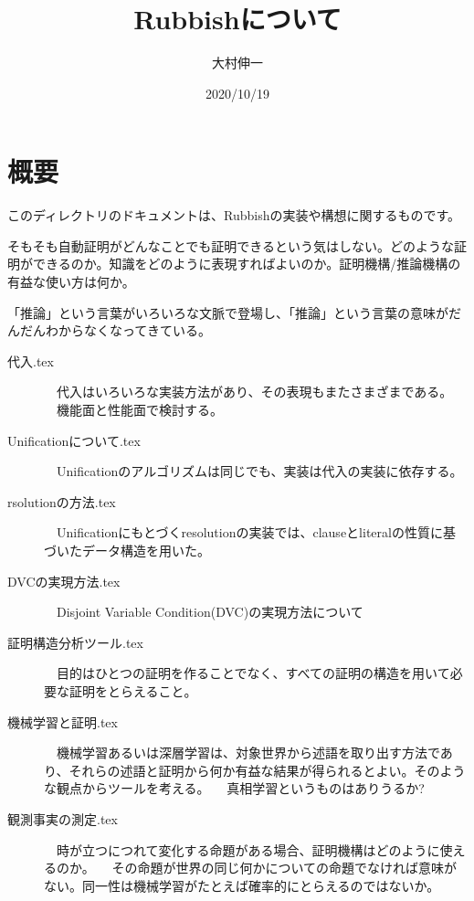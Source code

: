 \documentclass[10pt, oneside]{jarticle}   	%
\title{Rubbishについて}
\author{大村伸一}
\date{2020/10/19}				%
\theoremstyle{definition}
\begin{document}
\maketitle

\section{概要}
このディレクトリのドキュメントは、Rubbishの実装や構想に関するものです。

そもそも自動証明がどんなことでも証明できるという気はしない。どのような証明ができるのか。知識をどのように表現すればよいのか。証明機構/推論機構の有益な使い方は何か。

「推論」という言葉がいろいろな文脈で登場し、「推論」という言葉の意味がだんだんわからなくなってきている。

\begin{description}

\item[代入.tex]
　代入はいろいろな実装方法があり、その表現もまたさまざまである。
　機能面と性能面で検討する。

\item[Unificationについて.tex]
　Unificationのアルゴリズムは同じでも、実装は代入の実装に依存する。

\item[rsolutionの方法.tex]
　Unificationにもとづくresolutionの実装では、clauseとliteralの性質に基づいたデータ構造を用いた。

\item[DVCの実現方法.tex]
　Disjoint Variable Condition(DVC)の実現方法について

\item[証明構造分析ツール.tex]
　目的はひとつの証明を作ることでなく、すべての証明の構造を用いて必要な証明をとらえること。

\item[機械学習と証明.tex]
　機械学習あるいは深層学習は、対象世界から述語を取り出す方法であり、それらの述語と証明から何か有益な結果が得られるとよい。そのような観点からツールを考える。
　真相学習というものはありうるか?

\item[観測事実の測定.tex]
　時が立つにつれて変化する命題がある場合、証明機構はどのように使えるのか。
　その命題が世界の同じ何かについての命題でなければ意味がない。同一性は機械学習がたとえば確率的にとらえるのではないか。

\end{description}
\end{document}
